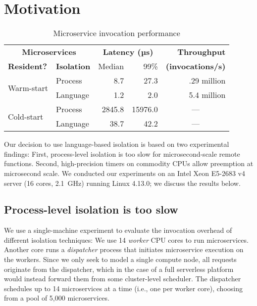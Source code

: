 \section{Motivation}
\label{sec:motive}

\begin{table}
\begin{center}
\small
\begin{tabular}{llrrr}
  \multicolumn{2}{c}{\textbf{Microservices}} & \multicolumn{2}{c}{\textbf{Latency (µs)}} & \textbf{Throughput} \\
  \textbf{Resident?} & \textbf{Isolation} & Median & 99\% & \textbf{(invocations/s)} \\
\midrule
\multirow{2}{*}{Warm-start} & Process & 8.7 & 27.3 & .29 million \\
& Language & 1.2 & 2.0 & 5.4 million \\
\midrule
\multirow{2}{*}{Cold-start} & Process & 2845.8 & 15976.0 & \multicolumn{1}{c}{---} \\
& Language & 38.7 & 42.2 & \multicolumn{1}{c}{---} \\
\end{tabular}
\caption{Microservice invocation performance}
\label{tab:invocperf}
\end{center}
\end{table}

Our decision to use language-based isolation is based on two experimental
findings:  First, process-level isolation is too slow for
microsecond-scale remote functions. Second, high-precision timers on commodity
CPUs allow preemption at microsecond scale.  We conducted our experiments
on an Intel Xeon E5-2683 v4 server (16 cores, 2.1~GHz) running
Linux 4.13.0; we discuss the results below.

\subsection{Process-level isolation is too slow}
We use a single-machine experiment to evaluate the invocation overhead of different
isolation techniques: We use 14 \emph{worker} CPU cores to run microservices. Another
core runs a \emph{dispatcher} process that initiates microservice execution on the
workers.  Since we only seek to model a single compute node, all requests originate
from the dispatcher, which in the case of a full serverless platform would instead
forward them from some cluster-level scheduler.  The dispatcher schedules up to 14
microservices at a time (i.e., one per worker core), choosing from a pool of 5,000
microservices.

